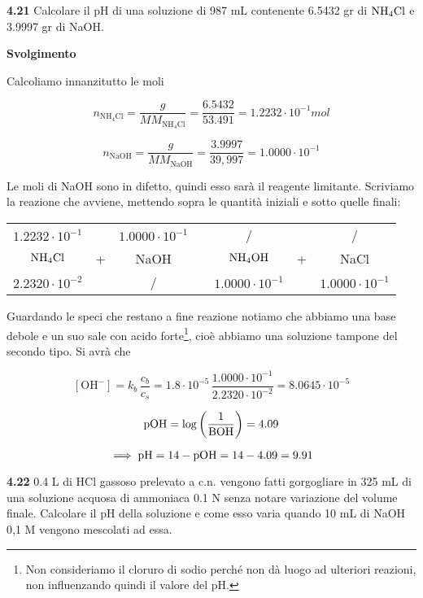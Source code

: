 \vspace{0.2cm}

\vspace{0.2cm}\textbf{4.21} Calcolare il pH di una soluzione di 987 mL contenente 6.5432 gr di $\rm NH_4Cl$ e 3.9997 gr di NaOH.

\vspace{0.2cm}\large\textbf{Svolgimento}\normalsize

\vspace{0.2cm}Calcoliamo innanzitutto le moli

$$n_{\text{NH}_4\text{Cl}}=\frac{g}{MM_{\text{NH}_4\text{Cl}}}=\frac{6.5432}{53.491}=1.2232 \cdot 10^{-1} mol$$

$$n_{\text{NaOH}}=\frac{g}{MM_{\text{NaOH}}}=\frac{3.9997}{39,997}=1.0000 \cdot 10^{-1}$$

Le moli di NaOH sono in difetto, quindi esso sarà il reagente limitante. Scriviamo la reazione che avviene, mettendo sopra le quantità iniziali e sotto quelle finali:

\begin{center}
    \begin{tabular}{ccccccc}
        $1.2232 \cdot 10^{-1}$ &  & $1.0000 \cdot 10^{-1}$ & & / & & /\\
        $\rm NH_4Cl$ & + & NaOH & \ce{->} & $\rm NH_4OH$ & + & NaCl\\
        $2.2320 \cdot 10^{-2}$ &  & / & & $1.0000 \cdot 10^{-1}$ & &$1.0000 \cdot 10^{-1}$\\
    \end{tabular}
\end{center}

Guardando le speci che restano a fine reazione notiamo che abbiamo una base debole e un suo sale con acido forte\footnote{Non consideriamo il cloruro di sodio perché non dà luogo ad ulteriori reazioni, non influenzando quindi il valore del pH.}, cioè abbiamo una soluzione tampone del secondo tipo. Si avrà che

$$[\text{OH}^-]=k_b\,\frac{c_b}{c_s}
=1.8 \cdot 10^{-5}\,\frac{1.0000 \cdot 10^{-1}}{2.2320 \cdot 10^{-2}}
=8.0645 \cdot 10^{-5}$$

$$\rm pOH=\log \left( \frac{1}{BOH} \right)=4.09$$

$$\implies \rm pH=14-pOH=14-4.09=9.91$$

\vspace{0.2cm}\textbf{4.22} 0.4 L di HCl gassoso prelevato a c.n. vengono fatti gorgogliare in 325 mL di una soluzione acquosa di ammoniaca 0.1 N senza notare variazione del volume finale. Calcolare il pH della soluzione e come esso varia quando 10 mL di NaOH 0,1 M vengono mescolati ad essa.

